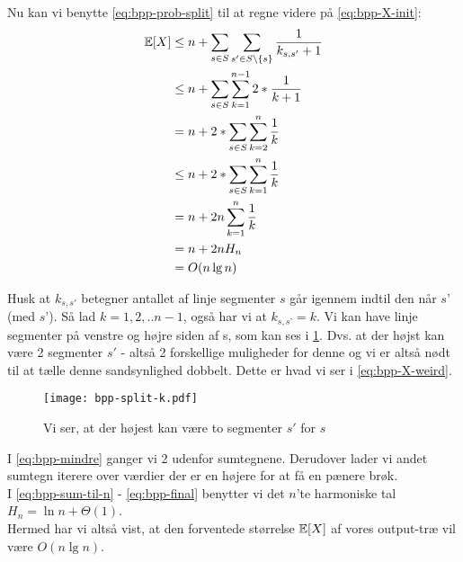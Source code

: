 Nu kan vi benytte \cref{eq:bpp-prob-split} til at regne videre på \cref{eq:bpp-X-init}:
\begin{align}
{\mathbb E}[X] &\leq n + \sum_{s \in S} \sum_{s' \in S \backslash \{ s\}} \frac{1}{k_{s, s'}+1} \nonumber \\
      &\leq n + \sum_{s \in S} \sum_{k=1}^{n-1} 2 * \frac{1}{k+1} \label{eq:bpp-X-weird} \\
      &= n + 2 * \sum_{s \in S} \sum_{k=2}^{n} \frac{1}{k} \label{eq:bpp-mindre} \\
      &\leq n + 2 * \sum_{s \in S} \sum_{k=1}^{n} \frac{1}{k} \nonumber \\
      &= n + 2n \sum_{k=1}^{n} \frac{1}{k} \label{eq:bpp-sum-til-n} \\
      &= n + 2n H_n \label{eq:bpp-harmonic} \\
      &= O(n \lg n) \label{eq:bpp-final}
\end{align}



Husk at $k_{s, s'}$ betegner antallet af linje segmenter $s$ går igennem indtil den når $s’$ (med $s’$). Så lad $k=1,2,..n-1$, også har vi at $k_{s,s’} = k$. Vi kan have linje segmenter på venstre og højre siden af s, som kan ses i \cref{fig:bpp-split-k}. Dvs. at der højst kan være 2 segmenter $s'$ - altså 2 forskellige muligheder for denne og vi er altså nødt til at tælle denne sandsynlighed dobbelt. Dette er hvad vi ser i \cref{eq:bpp-X-weird}.


\begin{figure}[H]
    \begin{center}
    \texttt{[image: bpp-split-k.pdf]}
    \end{center}
    \caption{Vi ser, at der højest kan være to segmenter $s'$ for $s$}
    \label{fig:bpp-split-k}
\end{figure}

I \cref{eq:bpp-mindre} ganger vi 2 udenfor sumtegnene. Derudover lader vi andet sumtegn iterere over værdier der er en højere for at få en pænere brøk.\\
I \cref{eq:bpp-sum-til-n} - \cref{eq:bpp-final} benytter vi det $n$'te harmoniske tal $H_n = \ln n + \Theta(1)$.\\

Hermed har vi altså vist, at den forventede størrelse ${\mathbb E}[X]$ af vores output-træ vil være $O(n \lg n)$.
